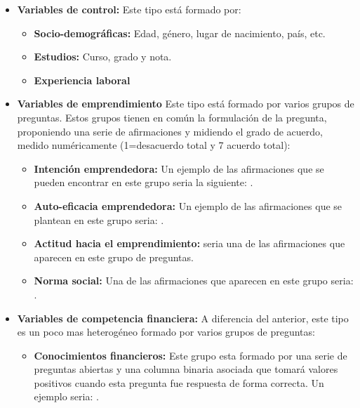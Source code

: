 \begin{itemize}
	\item \textbf{Variables de control:} Este tipo está formado por:
	      \begin{itemize}
		      \item \textbf{Socio-demográficas:} Edad, género, lugar de nacimiento, país, etc.
		      \item \textbf{Estudios:} Curso, grado y nota.
		      \item \textbf{Experiencia laboral}
	      \end{itemize}
	\item \textbf{Variables de emprendimiento} Este tipo está formado por varios grupos de preguntas. Estos grupos tienen en común la formulación de la pregunta, proponiendo una serie de afirmaciones y midiendo el grado de acuerdo, medido numéricamente (1=desacuerdo total y 7 acuerdo total):
	      \begin{itemize}
		      \item \textbf{Intención emprendedora:} Un ejemplo de las afirmaciones que se pueden encontrar en este grupo seria la siguiente: .
		      \item \textbf{Auto-eficacia emprendedora:} Un ejemplo de las afirmaciones que se plantean en este grupo seria: .
		      \item \textbf{Actitud hacia el emprendimiento:}  seria una de las afirmaciones que aparecen en este grupo de preguntas.
		      \item \textbf{Norma social:} Una de las afirmaciones que aparecen en este grupo seria: .
	      \end{itemize}
	\item\textbf{Variables de competencia financiera:} A diferencia del anterior, este tipo es un poco mas heterogéneo formado por varios grupos de preguntas:
	      \begin{itemize}
		      \item \textbf{Conocimientos financieros:} Este grupo esta formado por una serie de preguntas abiertas y una columna binaria asociada que tomará valores positivos cuando esta pregunta fue respuesta de forma correcta. Un ejemplo seria: .

\end{itemize}
\end{itemize}

